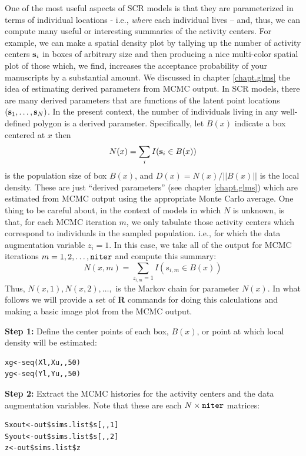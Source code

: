 One of the most useful aspects of SCR models is that they are
parameterized in terms of individual locations - i.e., {\it where}
each individual lives -- and, thus, we can compute many useful or
interesting summaries of the activity centers.  For example, we can
make a spatial density plot by tallying up the number of activity
centers ${\bf s}_{i}$ in boxes of arbitrary size and then producing a
nice multi-color spatial plot of those which, we find, increases the
acceptance probability of your manuscripts by a substantial amount.
We discussed in chapter \ref{chapt.glms} the idea of estimating
derived parameters from MCMC output. In SCR models, there are many
derived parameters that are functions of the latent point locations
$({\bf s}_{1},\ldots, {\bf s}_{N})$. In the present context, the
number of individuals living in any well-defined polygon is a derived
parameter. Specifically, let $B(x)$ indicate a box centered at $x$
then
\[
N(x)=\sum_{i} I({\bf s}_{i} \in B(x))
\]
is the population size of box $B(x)$, and $D(x) = N(x)/||B(x)||$ is
the local density. These are just ``derived parameters'' (see chapter
\ref{chapt.glms}) which are estimated from MCMC output using the
appropriate Monte Carlo average. One thing to be careful about, in the
context of models in which $N$ is unknown, is that, for each MCMC
iteration $m$, we only tabulate those activity centers which
correspond to individuals in the sampled population. i.e., for which
the data augmentation variable $z_{i} = 1$.  In this case, we take all
of the output for MCMC iterations $m=1,2,\ldots,\mbox{\tt niter}$ and
compute this summary:
\[
   N(x,m) = \sum_{z_{i,m}=1} I(s_{i,m} \in B(x))
\]
Thus, $N(x,1),N(x,2),\dots,$ is the Markov chain for parameter $N(x)$.
In what follows we will provide a set of {\bf R} commands for doing
this calculations and making a basic image plot from the MCMC output.

{\flushleft \bf Step 1:} Define the center points of each box, $B(x)$,
or point at which local density will be estimated:
\begin{verbatim}
xg<-seq(Xl,Xu,,50)
yg<-seq(Yl,Yu,,50)
\end{verbatim}

{\flushleft \bf Step 2:} Extract the MCMC histories for the activity
centers and the data augmentation variables.  Note that these are each
$N \times \mbox{\tt niter}$ matrices:
\begin{verbatim}
Sxout<-out$sims.list$s[,,1]
Syout<-out$sims.list$s[,,2]
z<-out$sims.list$z
\end{verbatim}

